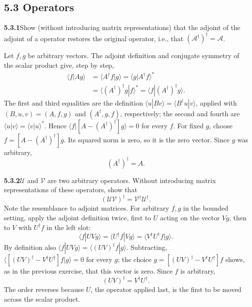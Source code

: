 \subsection*{5.3 Operators}

\par\bigskip
\noindent\textbf{5.3.1}\quad Show (without introducing matrix representations)
that the adjoint of the adjoint of a  operator restores the original operator,
i.e., that $(\mathcal{A}^{\dagger})^{\dagger}=\mathcal{A}$.
\solution
{}

Let $f,g$ be arbitrary vectors. The adjoint definition and conjugate
symmetry of the scalar product give, step by step,
\begin{align*}
\langle f|Ag\rangle
&=\langle A^\dagger f|g\rangle
=\langle g|A^\dagger f\rangle^*\\
&=\langle(A^\dagger)^\dagger g|f\rangle^*
=\langle f|(A^\dagger)^\dagger g\rangle.
\end{align*}
The first and third equalities are the definition
$\langle u|Bv\rangle=\langle B^\dagger u|v\rangle$, applied with
$(B,u,v)=(A,f,g)$ and $(A^\dagger,g,f)$, respectively; the second and
fourth are $\langle u|v\rangle=\langle v|u\rangle^*$.
Hence $\langle f|[A-(A^\dagger)^\dagger]g\rangle=0$ for every $f$.
For fixed $g$, choose $f=[A-(A^\dagger)^\dagger]g$. Its squared norm is
zero, so it is the zero vector. Since $g$ was arbitrary,
\[
\boxed{(A^\dagger)^\dagger=A}.
\]

\par\bigskip
\noindent\textbf{5.3.2}\quad $\mathcal{U}$ and $\mathcal{V}$ are two arbitrary
 operators. Without introducing matrix representations of these operators, show
that
\[
(\mathcal{U}\mathcal{V})^{\dagger}
=\mathcal{V}^{\dagger}\mathcal{U}^{\dagger}.
\]
Note the resemblance to adjoint matrices.
\solution
{}
For arbitrary $f,g$ in the bounded setting, apply the adjoint definition
twice, first to $U$ acting on the vector $Vg$, then to $V$ with $U^\dagger f$
in the left slot:
\[
\langle f|UVg\rangle
=\langle U^\dagger f|Vg\rangle
=\langle V^\dagger U^\dagger f|g\rangle.
\]
By definition also $\langle f|UVg\rangle=\langle(UV)^\dagger f|g\rangle$.
Subtracting, $\langle[(UV)^\dagger-V^\dagger U^\dagger]f|g\rangle=0$ for
every $g$; the choice $g=[(UV)^\dagger-V^\dagger U^\dagger]f$ shows, as in
the previous exercise, that this vector is zero. Since $f$ is arbitrary,
\[
\boxed{(UV)^\dagger=V^\dagger U^\dagger}.
\]
The order reverses because $U$, the operator applied last, is the first
to be moved across the scalar product.

